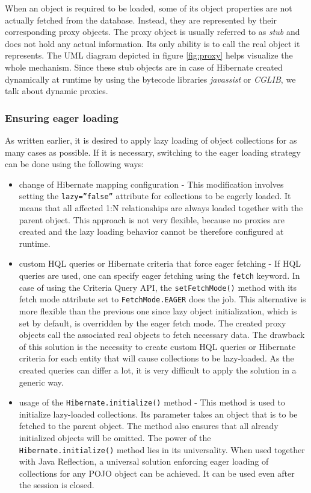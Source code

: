 \documentclass[12pt, oneside, a4paper]{book}
\begin{document}
When an object is required to be loaded, some of its object properties are not actually fetched from the database. Instead, they are represented by their corresponding proxy objects. 
The proxy object is usually referred to as \textit{stub} and does not hold any actual information. 
Its only ability is to call the real object it represents. The UML diagram depicted in figure \ref{fig:proxy} helps visualize the whole mechanism.
Since these stub objects are in case of Hibernate created dynamically at runtime by using the bytecode libraries \textit{javassist} or \textit{CGLIB}, we talk about dynamic proxies. 


\subsubsection{Ensuring eager loading}

As written earlier, it is desired to apply lazy loading of object collections for as many cases as possible. If it is necessary, switching to the eager loading strategy can be done using the following ways:

\begin{itemize}
	\item{change of Hibernate mapping configuration}
	- This modification involves setting the \texttt{lazy=''false''} attribute for collections to be eagerly loaded. 
	It means that all affected 1:N relationships are always loaded together with the parent object. 
	This approach is not very flexible, because no proxies are created and the lazy loading behavior cannot be therefore configured at runtime.

	\item {custom HQL queries or Hibernate criteria that force eager fetching}
	- If HQL queries are used, one can specify eager fetching using the \texttt{fetch} keyword. 
	In case of using the Criteria Query API, the \texttt{setFetchMode()} method with its fetch mode attribute set to \texttt{FetchMode.EAGER} does the job.
	This alternative is more flexible than the previous one since lazy object initialization, which is set by default, is overridden by the eager fetch mode. 
	The created proxy objects call the associated real objects to fetch necessary data. 
	The drawback of this solution is the necessity to create custom HQL queries or Hibernate criteria for each entity that will cause collections to be lazy-loaded. As the created queries can differ a lot, it is very difficult to apply the solution in a generic way.
	

	\item {usage of the \texttt{Hibernate.initialize()} method} 
		- This method is used to initialize lazy-loaded collections. Its parameter takes an object that is to be fetched to the parent object.
		The method also ensures that all already initialized objects will be omitted.
		The power of the \texttt{Hibernate.initialize()} method lies in its universality. When used together with Java Reflection, a universal solution enforcing eager loading of collections for any POJO object can be achieved. 
		It can be used even after the session is closed.

\end{itemize}
\end{document}
